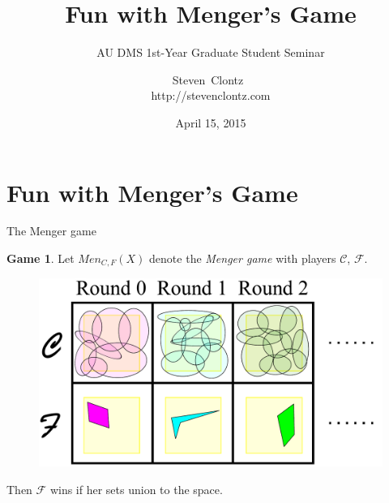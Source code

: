 \documentclass{beamer}
\title
{Fun with Menger's Game}
\subtitle
{AU DMS 1st-Year Graduate Student Seminar} %
\author%
{Steven~Clontz~\\http://stevenclontz.com}%
\institute[Auburn University] %
{
  Department of Mathematics and Statistics\\
  Auburn University}
\date[15-04-15] %
{April 15, 2015}
\newtheorem{proposition}[theorem]{Proposition}
\theoremstyle{definition}
\newtheorem{game}[theorem]{Game}
\newcommand{\menGame}[1]{Men_{C,F}\left({#1}\right)}
\newcommand{\<}{\langle}
\renewcommand{\>}{\rangle}
\newcommand{\mc}[1]{\mathcal{#1}}
\newcommand{\pl}[1]{\mathscr{#1}}
\newcommand{\term}{\textit}
\begin{document}
\newcommand{\vpause}{\pause\vspace{1em}}

\begin{frame}
  \titlepage
\end{frame}

\section{Fun with Menger's Game}





\begin{frame}{The Menger game}
  \begin{game}
    Let \(\menGame{X}\) denote the \term{Menger game} with players
    \(\pl C\), \(\pl F\).
    \begin{figure}
      \includegraphics[width=0.6\linewidth]{mengerGame.pdf}
    \end{figure}

    Then \(\pl F\) wins if her sets union to the space.
  \end{game}
\end{frame}
\end{document}
